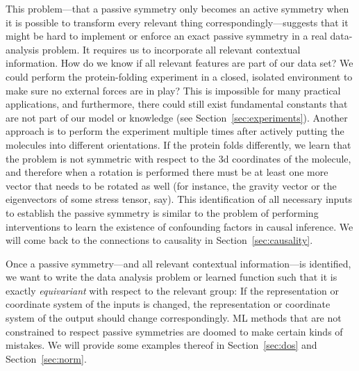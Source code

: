 \documentclass{article} %
\newcommand{\sectionname}{Section}
\newcommand{\secref}[1]{\sectionname~\ref{#1}}
\begin{document}
This problem---that a passive symmetry only becomes an active symmetry when it is possible to transform every relevant thing correspondingly---suggests that it might be hard to implement or enforce an exact passive symmetry in a real data-analysis problem.
It requires us to incorporate all relevant contextual information.
How do we know if all relevant features are part of our data set?
We could perform the protein-folding experiment in a closed, isolated environment to make sure no external forces are in play?
This is impossible for many practical applications, and furthermore, there could still exist fundamental constants that are not part of our model or knowledge (see \secref{sec:experiments}).
Another approach is to perform the experiment multiple times after actively putting the molecules into different orientations.
If the protein folds differently, we learn that the problem is not symmetric with respect to the 3d coordinates of the molecule, and therefore when a rotation is performed there must be at least one more vector that needs to be rotated as well (for instance, the gravity vector or the eigenvectors of some stress tensor, say).
This identification of all necessary inputs to establish the passive symmetry is similar to the problem of performing interventions to learn the existence of confounding factors in causal inference.
We will come back to the connections to causality in \secref{sec:causality}.

Once a passive symmetry---and all relevant contextual information---is identified, we want to write the data analysis problem or learned function such that it is exactly \emph{equivariant} with respect to the relevant group:
If the representation or coordinate system of the inputs is changed, the representation or coordinate system of the output should change correspondingly.
ML methods that are not constrained to respect passive symmetries are doomed to make certain kinds of mistakes.
We will provide some examples thereof in \secref{sec:dos} and \secref{sec:norm}.
\end{document}
